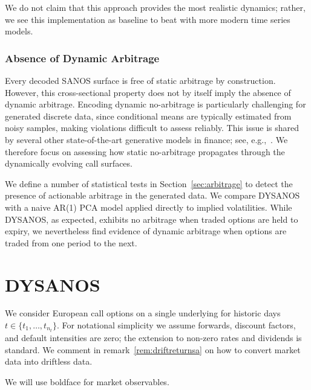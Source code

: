 \documentclass[11pt,a4paper]{article}
\begin{document}
    We do not
    claim that this approach provides the most realistic dynamics; rather,
    we see this implementation as baseline to beat with more modern
    time series models.

\subsubsection*{Absence of Dynamic Arbitrage}

Every decoded SANOS surface is free of static arbitrage by construction. However, this cross-sectional property does not by itself imply the absence of dynamic arbitrage. Encoding dynamic no-arbitrage is particularly challenging for generated discrete data, since conditional means are typically estimated from noisy samples, making violations difficult to assess reliably. This issue is shared by several other state-of-the-art generative models in finance; see, e.g.,~\cite{VolGAN,na2023computing,wang2025controllable,bajalica2026latent}. We therefore focus on assessing how static no-arbitrage propagates through the dynamically evolving call surfaces.

We define a number of statistical tests in Section~\ref{sec:arbitrage} to detect the presence of actionable arbitrage in the generated data. We compare DYSANOS with a naive AR(1) PCA model applied directly to implied volatilities. While DYSANOS, as expected, exhibits no arbitrage when traded options are held to expiry, we nevertheless find evidence of dynamic arbitrage when options are traded from one period to the next.
 

\section{DYSANOS}

\label{sec:markets}


We consider European call options on a single underlying
for historic days $t\in \{t_1,\ldots,t_{n_t}\}$.
For notational simplicity we assume forwards, discount factors, and default
intensities are zero; the extension to non-zero rates and dividends is standard.
We comment in remark~\ref{rem:driftreturnsa} on how to convert
market data into driftless data.

We will use boldface for market observables.
\end{document}
